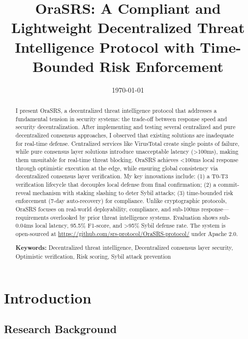 \documentclass[12pt]{article}
\title{OraSRS: A Compliant and Lightweight Decentralized Threat Intelligence Protocol with Time-Bounded Risk Enforcement}
\date{\today}
\begin{document}
\maketitle

\begin{abstract}
I present OraSRS, a decentralized threat intelligence protocol that addresses a fundamental tension in security systems: the trade-off between response speed and security decentralization. After implementing and testing several centralized and pure decentralized consensus approaches, I observed that existing solutions are inadequate for real-time defense. Centralized services like VirusTotal create single points of failure, while pure consensus layer solutions introduce unacceptable latency (>100ms), making them unsuitable for real-time threat blocking. OraSRS achieves <100ms local response through optimistic execution at the edge, while ensuring global consistency via decentralized consensus layer verification. My key innovations include: (1) a T0-T3 verification lifecycle that decouples local defense from final confirmation; (2) a commit-reveal mechanism with staking slashing to deter Sybil attacks; (3) time-bounded risk enforcement (7-day auto-recovery) for compliance. Unlike cryptographic protocols, OraSRS focuses on real-world deployability, compliance, and sub-100ms response—requirements overlooked by prior threat intelligence systems. Evaluation shows sub-0.04ms local latency, 95.5\% F1-score, and >95\% Sybil defense rate. The system is open-sourced at \url{https://github.com/srs-protocol/OraSRS-protocol/} under Apache 2.0.

\textbf{Keywords:} Decentralized threat intelligence, Decentralized consensus layer security, Optimistic verification, Risk scoring, Sybil attack prevention
\end{abstract}

\section{Introduction}

\subsection{Research Background}
\end{document}
